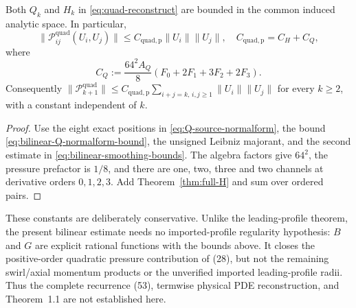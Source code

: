 \begin{corollary}\label{cor:all-quadratic-pressure}
Both $Q_k$ and $H_k$ in \eqref{eq:quad-reconstruct} are bounded in the common induced analytic space. In particular,
\begin{equation}\label{eq:quadratic-complete-constant}
 \|\mathcal P_{ij}^{\mathrm{quad}}(U_i,U_j)\|
 \le C_{\mathrm{quad,p}}\|U_i\|\|U_j\|,\quad
 C_{\mathrm{quad,p}}=C_H+C_Q,
\end{equation}
where
\begin{equation}\label{eq:CQ}
 C_Q:=\frac{64^2A_Q}{8}(F_0+2F_1+3F_2+2F_3).
\end{equation}
Consequently $\|\mathcal P_{k+1}^{\mathrm{quad}}\|
\le C_{\mathrm{quad,p}}\sum_{i+j=k,\,i,j\ge1}\|U_i\|\|U_j\|$
for every $k\ge2$, with a constant independent of $k$.
\end{corollary}
\begin{proof}
Use the eight exact positions in \eqref{eq:Q-source-normalform},
the bound \eqref{eq:bilinear-Q-normalform-bound}, the unsigned Leibniz
majorant, and the second estimate in \eqref{eq:bilinear-smoothing-bounds}.
The algebra factors give $64^2$, the pressure prefactor is $1/8$,
and there are one, two, three and two channels at derivative orders
$0,1,2,3$. Add Theorem~\ref{thm:full-H} and sum over ordered pairs.
\end{proof}

These constants are deliberately conservative. Unlike the leading-profile theorem, the present bilinear estimate needs no imported-profile regularity hypothesis: $B$ and $G$ are explicit rational functions with the bounds above. It closes the positive-order quadratic pressure contribution of (28), but not the remaining swirl/axial momentum products or the unverified imported leading-profile radii. Thus the complete recurrence (53), termwise physical PDE reconstruction, and Theorem~1.1 are not established here.
